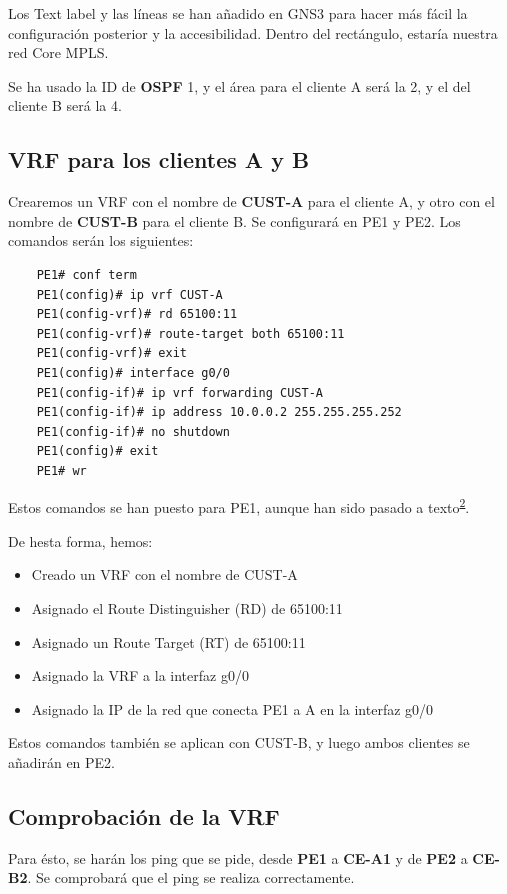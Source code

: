\documentclass{article}
\begin{document}
Los Text label y las líneas se han añadido en GNS3 para hacer más fácil la configuración posterior y la accesibilidad. Dentro del rectángulo, estaría nuestra red Core MPLS.

Se ha usado la ID de \textbf{OSPF} 1, y el área para el cliente A será la 2, y el del cliente B será la 4.

\subsection{VRF para los clientes A y B}

Crearemos un VRF con el nombre de \textbf{CUST-A} para el cliente A, y otro con el nombre de \textbf{CUST-B} para el cliente B. Se configurará en PE1 y PE2. Los comandos serán los siguientes:

\begin{verbatim}
    PE1# conf term
    PE1(config)# ip vrf CUST-A
    PE1(config-vrf)# rd 65100:11
    PE1(config-vrf)# route-target both 65100:11
    PE1(config-vrf)# exit
    PE1(config)# interface g0/0
    PE1(config-if)# ip vrf forwarding CUST-A
    PE1(config-if)# ip address 10.0.0.2 255.255.255.252
    PE1(config-if)# no shutdown
    PE1(config)# exit
    PE1# wr
\end{verbatim}
Estos comandos se han puesto para PE1, aunque han sido pasado a texto\textsuperscript{\hyperlink{nota2}{2}}.

De hesta forma, hemos:
\begin{itemize}
    \item Creado un VRF con el nombre de CUST-A
    \item Asignado el Route Distinguisher (RD) de 65100:11
    \item Asignado un Route Target (RT) de 65100:11
    \item Asignado la VRF a la interfaz g0/0
    \item Asignado la IP de la red que conecta PE1 a A en la interfaz g0/0
\end{itemize}

Estos comandos también se aplican con CUST-B, y luego ambos clientes se añadirán en PE2.

\subsection{Comprobación de la VRF}

Para ésto, se harán los ping que se pide, desde \textbf{PE1} a \textbf{CE-A1} y de \textbf{PE2} a \textbf{CE-B2}. Se comprobará que el ping se realiza correctamente.
\end{document}
